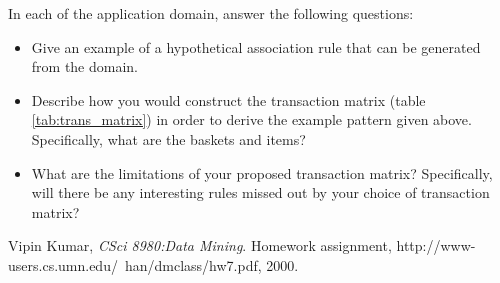 \documentclass{article}
\begin{document}
In each of the application domain, answer the following questions:
\begin{itemize} 
\item Give an example of a hypothetical association rule that can be generated from the domain. 
\item Describe how you would construct the transaction matrix (table \ref{tab:trans_matrix}) in order to derive the 
example pattern given above. Specifically, what are the baskets and items?  
\item What are the limitations of your proposed transaction matrix? Specifically, will there be any 
interesting rules missed out by your choice of transaction matrix?
\end{itemize}

\begin{thebibliography}{9}

  Vipin Kumar,
  \emph{CSci 8980:Data Mining}.
  Homework assignment,
  http://www-users.cs.umn.edu/~han/dmclass/hw7.pdf,
  2000.

\end{thebibliography}
\end{document}
